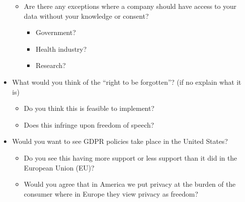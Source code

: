 \documentclass[12pt,
 reprint,
nofootinbib,
 amsmath,amssymb,
 aps,
]{revtex4-2}
\begin{document}
\begin{itemize}
\begin{itemize}
        \item Are there any exceptions where a company should have access to your data without your knowledge or consent?
        \begin{itemize}
            \item Government?
            \item Health industry?
            \item Research?
        \end{itemize}
    \end{itemize}
    \item What would you think of the “right to be forgotten”? (if no explain what it is)
    \begin{itemize}
        \item Do you think this is feasible to implement?
        \item Does this infringe upon freedom of speech?
    \end{itemize}
    \item Would you want to see GDPR policies take place in the United States?
    \begin{itemize}
        \item Do you see this having more support or less support than it did in the European Union (EU)?
        \item Would you agree that in America we put privacy at the burden of the consumer where in Europe they view privacy as freedom?
    \end{itemize}
\end{itemize}
\end{document}
